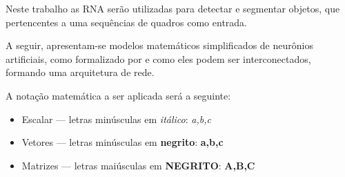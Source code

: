 \documentclass[
	12pt,				%
    oneside,			%
	a4paper,			%
	english,			%
	french,				%
	spanish,			%
	brazil,				%
	]{abntex2}
\begin{document}


Neste trabalho as RNA serão utilizadas para detectar e segmentar objetos, que pertencentes a uma sequências de quadros como entrada. 


A seguir, apresentam-se modelos matemáticos simplificados de neurônios artificiais, como formalizado por  e como eles podem ser interconectados, formando uma arquitetura de rede.

A notação matemática a ser aplicada será a seguinte:

\begin{itemize}
 
\item Escalar  — letras minúsculas em \textit{itálico}: \textit{a,b,c}
\item Vetores  — letras minúsculas em \textbf{negrito}: \textbf{a,b,c}
\item Matrizes — letras maiúsculas em \textbf{NEGRITO}: \textbf{A,B,C} 

\end{itemize}
\end{document}
